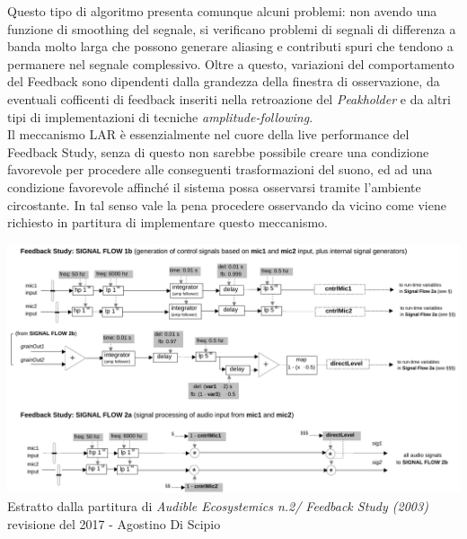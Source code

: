 Questo tipo di algoritmo presenta comunque alcuni problemi: non avendo
una funzione di smoothing del segnale, si verificano problemi di segnali di differenza a banda
molto larga che possono generare aliasing e contributi spuri che tendono a permanere nel
segnale complessivo.
Oltre a questo, variazioni del comportamento del Feedback sono dipendenti dalla grandezza
della finestra di osservazione, da eventuali cofficenti di feedback inseriti nella
retroazione del \textit{Peakholder} e da altri tipi di implementazioni di tecniche 
\textit{amplitude-following}. \\
Il meccanismo LAR è essenzialmente nel cuore della live performance del Feedback Study,
senza di questo non sarebbe possibile creare una condizione favorevole per procedere alle 
conseguenti trasformazioni del suono, ed ad una condizione favorevole affinché il 
sistema possa osservarsi tramite l'ambiente circostante. 
In tal senso vale la pena procedere osservando da vicino come viene richiesto in partitura 
di implementare questo meccanismo.

\begin{center}
\includegraphics[width=14cm]{figures/LARfeedbackstudy2017.pdf} \\
{Estratto dalla partitura di \textit{Audible Ecosystemics n.2/ Feedback Study (2003)} \\
revisione del 2017 - Agostino Di Scipio} \\ 
\vspace{0.5cm}
\end{center}


